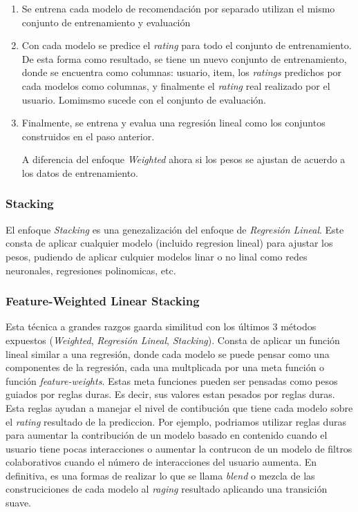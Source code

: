 \documentclass[11pt,a4paper,twoside]{thesis}
\begin{document}
\begin{enumerate}
	\item Se entrena cada modelo de recomendación por separado utilizan el mismo conjunto
	      de entrenamiento y evaluación
	\item Con cada modelo se predice el \textit{rating} para todo el conjunto de
	      entrenamiento. De esta forma como resultado, se tiene un nuevo conjunto de
	      entrenamiento, donde se encuentra como columnas: usuario, item, los
	      \textit{ratings} predichos por cada modelos como columnas, y finalmente el
	      \textit{rating} real realizado por el usuario. Lomimsmo sucede con el conjunto
	      de evaluación.
	\item Finalmente, se entrena y evalua una regresión lineal como los conjuntos
	      construidos en el paso anterior.

	      A diferencia del enfoque \textit{Weighted} ahora si los pesos se ajustan de
	      acuerdo a los datos de entrenamiento.

\end{enumerate}

\subsubsection{Stacking}

El enfoque \textit{Stacking} es una genezalización del enfoque de
\textit{Regresión Lineal}. Este consta de aplicar cualquier modelo (incluido
regresion lineal) para ajustar los pesos, pudiendo de aplicar culquier modelos
linar o no linal como redes neuronales, regresiones polinomicas, etc.

\subsubsection{Feature-Weighted Linear Stacking}

Esta técnica a grandes razgos gaarda similitud con los últimos 3 métodos
expuestos (\textit{Weighted}, \textit{Regresión Lineal}, \textit{Stacking}).
Consta de aplicar un función lineal similar a una regresión, donde cada modelo
se puede pensar como una componentes de la regresión, cada una multplicada por
una meta función o función \textit{feature-weights}. Estas meta funciones
pueden ser pensadas como pesos guiados por reglas duras. Es decir, sus valores
estan pesados por reglas duras. Esta reglas ayudan a manejar el nivel de
contibución que tiene cada modelo sobre el \textit{rating} resultado de la
prediccion. Por ejemplo, podriamos utilizar reglas duras para aumentar la
contribución de un modelo basado en contenido cuando el usuario tiene pocas
interacciones o aumentar la contrucon de un modelo de filtros colaborativos
cuando el número de interacciones del usuario aumenta. En definitiva, es una
formas de realizar lo que se llama \textit{blend} o mezcla de las
construciciones de cada modelo al \textit{raging} resultado aplicando una
transición suave.
\end{document}
